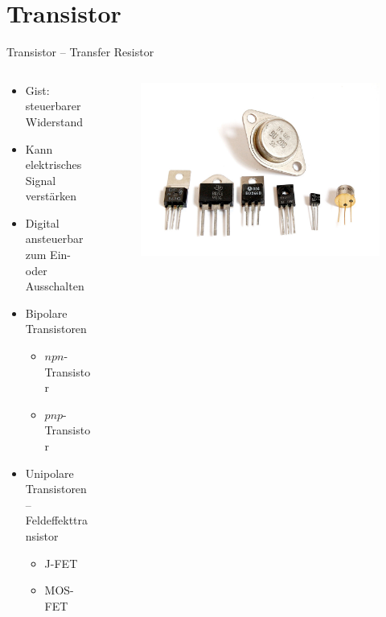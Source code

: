 \documentclass[12pt%
,aspectratio=169%
]{beamer}
\begin{document}
\section{Transistor}
\begin{frame}{Transistor -- Transfer Resistor}
\begin{columns}[T] %
\begin{column}{.48\textwidth}
	\begin{itemize}
		\item Gist: steuerbarer Widerstand
		\item Kann elektrisches Signal verstärken
		\item Digital ansteuerbar zum Ein- oder Ausschalten
		\item Bipolare Transistoren
		\begin{itemize}
			\item $npn$-Transistor
			\item $pnp$-Transistor
		\end{itemize}
		\item Unipolare Transistoren -- Feldeffekttransistor
		\begin{itemize}
			\item J-FET
			\item MOS-FET
		\end{itemize}
	\end{itemize}
\end{column}%
\hfill%
\begin{column}{.48\textwidth}
\begin{figure}
\center
\includegraphics[scale=0.16]{pictures/transistors}
\end{figure}
\end{column}%
\end{columns}
\end{frame}
\end{document}
